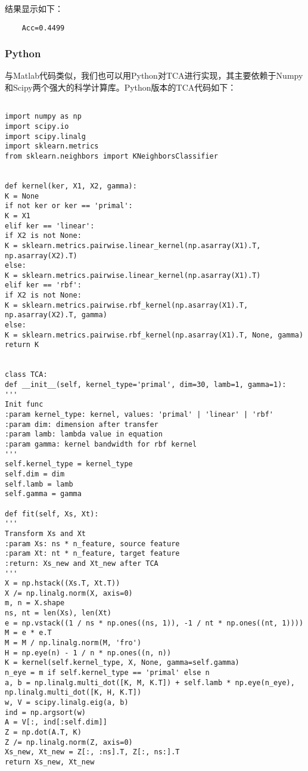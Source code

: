 结果显示如下：
\begin{lstlisting}
	Acc=0.4499
\end{lstlisting}

\subsubsection{Python}

与Matlab代码类似，我们也可以用Python对TCA进行实现，其主要依赖于Numpy和Scipy两个强大的科学计算库。Python版本的TCA代码如下：

\begin{lstlisting}[title=TCA方法的Python实现, frame=shadowbox]

import numpy as np
import scipy.io
import scipy.linalg
import sklearn.metrics
from sklearn.neighbors import KNeighborsClassifier


def kernel(ker, X1, X2, gamma):
K = None
if not ker or ker == 'primal':
K = X1
elif ker == 'linear':
if X2 is not None:
K = sklearn.metrics.pairwise.linear_kernel(np.asarray(X1).T, np.asarray(X2).T)
else:
K = sklearn.metrics.pairwise.linear_kernel(np.asarray(X1).T)
elif ker == 'rbf':
if X2 is not None:
K = sklearn.metrics.pairwise.rbf_kernel(np.asarray(X1).T, np.asarray(X2).T, gamma)
else:
K = sklearn.metrics.pairwise.rbf_kernel(np.asarray(X1).T, None, gamma)
return K


class TCA:
def __init__(self, kernel_type='primal', dim=30, lamb=1, gamma=1):
'''
Init func
:param kernel_type: kernel, values: 'primal' | 'linear' | 'rbf'
:param dim: dimension after transfer
:param lamb: lambda value in equation
:param gamma: kernel bandwidth for rbf kernel
'''
self.kernel_type = kernel_type
self.dim = dim
self.lamb = lamb
self.gamma = gamma

def fit(self, Xs, Xt):
'''
Transform Xs and Xt
:param Xs: ns * n_feature, source feature
:param Xt: nt * n_feature, target feature
:return: Xs_new and Xt_new after TCA
'''
X = np.hstack((Xs.T, Xt.T))
X /= np.linalg.norm(X, axis=0)
m, n = X.shape
ns, nt = len(Xs), len(Xt)
e = np.vstack((1 / ns * np.ones((ns, 1)), -1 / nt * np.ones((nt, 1))))
M = e * e.T
M = M / np.linalg.norm(M, 'fro')
H = np.eye(n) - 1 / n * np.ones((n, n))
K = kernel(self.kernel_type, X, None, gamma=self.gamma)
n_eye = m if self.kernel_type == 'primal' else n
a, b = np.linalg.multi_dot([K, M, K.T]) + self.lamb * np.eye(n_eye), np.linalg.multi_dot([K, H, K.T])
w, V = scipy.linalg.eig(a, b)
ind = np.argsort(w)
A = V[:, ind[:self.dim]]
Z = np.dot(A.T, K)
Z /= np.linalg.norm(Z, axis=0)
Xs_new, Xt_new = Z[:, :ns].T, Z[:, ns:].T
return Xs_new, Xt_new


\end{lstlisting}
